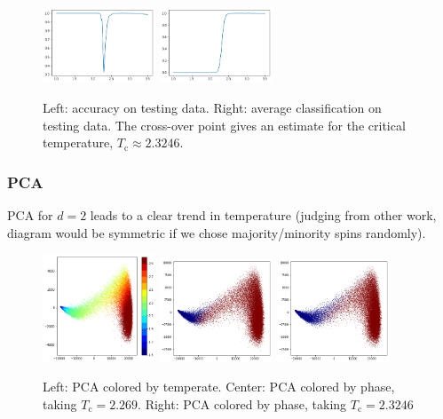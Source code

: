 \documentclass[11pt]{article}
\begin{document}
\begin{figure}[h]
    \centering
    \includegraphics[width=0.3\textwidth]{ising_images/kmeans_2d_ising}
    \includegraphics[width=0.3\textwidth]{ising_images/kmeans_avg_2d_ising}
    \caption{Left: accuracy on testing data. Right: average classification on testing data. The cross-over point gives an estimate for the critical temperature, $T_\text{c}\approx 2.3246$.}
    \label{ref:IsingKmeans}
\end{figure}

\subsubsection{PCA}
PCA for $d=2$ leads to a clear trend in temperature (judging from other work, diagram would be symmetric if we chose majority/minority spins randomly).

\begin{figure}[h]
    \centering
    \includegraphics[width=0.3\textwidth]{ising_images/pca_2d_ising}
    \includegraphics[width=0.3\textwidth]{ising_images/pca_phase_2d_ising}
    \includegraphics[width=0.3\textwidth]{ising_images/pca_phase2_2d_ising}
    \caption{Left: PCA colored by temperate. Center: PCA colored by phase, taking $T_\text{c}=2.269$. Right: PCA colored by phase, taking $T_\text{c}=2.3246$}
    \label{fig:IsingPCA}
\end{figure}
\end{document}
